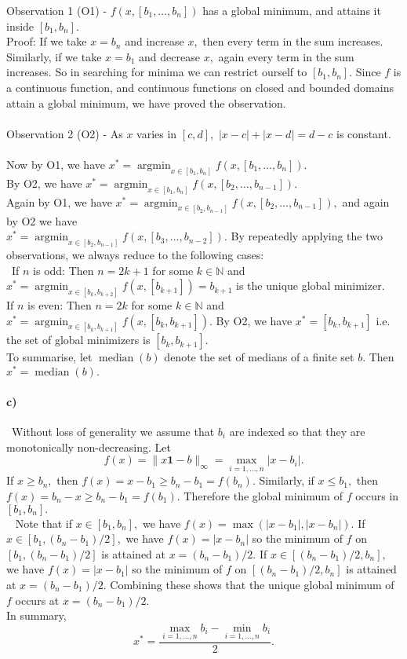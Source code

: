\documentclass[a4paper,12pt]{article}
\begin{document}
Observation 1 (O1) - $f(x, [b_1, \ldots, b_n])$ has a global minimum, and attains it inside $[b_1, b_n].$ 
\\
Proof: If we take $x=b_n$ and increase $x,$ then every term in the sum increases. Similarly, if we take $x=b_1$ and decrease $x,$ again every term in the sum increases. So in searching for minima we can restrict ourself to $[b_1,b_n].$ Since $f$ is a continuous function, and continuous functions on closed and bounded domains attain a global minimum, we have proved the observation. \\
\\
Observation 2 (O2) - As $x$ varies in $[c, d],$ $|x-c| + |x-d| = d-c$ is constant. \\
\\
Now by O1, we have $x^* = \operatorname{argmin}_{x\in[b_1,b_n]} f(x,[b_1,\ldots, b_n]).$ \\
By O2, we have $x^* = \operatorname{argmin}_{x\in[b_1,b_n]} f(x,[b_2,\ldots, b_{n-1}]).$ \\
Again by O1, we have $x^* = \operatorname{argmin}_{x\in[b_2,b_{n-1}]} f(x,[b_2,\ldots, b_{n-1}]),$ and again by O2 we have \\
$x^* = \operatorname{argmin}_{x\in[b_2,b_{n-1}]} f(x,[b_3,\ldots, b_{n-2}]).$ By repeatedly applying the two observations, we always reduce to the following cases: \\
\
If $n$ is odd: Then $n=2k+1$ for some $k\in \mathbb{N}$ and $x^* = \operatorname{argmin}_{x\in [b_k, b_{k+2}]} f(x, [b_{k+1}]) = b_{k+1}$ is the unique global minimizer.\\
If $n$ is even: Then $n=2k$ for some $k\in \mathbb{N}$ and $x^* = \operatorname{argmin}_{x\in [b_k, b_{k+1}]} f(x, [b_k, b_{k+1}]).$ By O2, we have $x^* = [b_k, b_{k+1}]$ i.e. the set of global minimizers is $[b_k, b_{k+1}].$ 
\\ To summarise, let $\operatorname{median}(b)$ denote the set of medians of a finite set $b.$ Then $x^* =  \operatorname{median}(b).$

\paragraph{c)}
\
Without loss of generality we assume that $b_i$ are indexed so that they are monotonically non-decreasing. Let $$f(x) = \| x \mathbf{1} - b \|_{\infty} = \max_{i=1,\ldots, n} | x- b_i|.$$ If $x\geq b_n, $ then $f(x) = x - b_1 \geq b_n-b_1 = f(b_n).$ Similarly, if $x\leq b_1,$ then $f(x) = b_n - x \geq b_n - b_1 = f(b_1). $ Therefore the global minimum of $f$ occurs in $[b_1, b_n]. $\\
\
\newline
Note that if $x\in [b_1, b_n],$ we have $f(x) = \max( |x-b_1|, |x-b_n|).$ If $x\in [b_1, (b_n-b_1)/2],$ we have $f(x) = |x-b_n|$ so the minimum of $f$ on $[b_1, (b_n-b_1)/2]$ is attained at $x = (b_n-b_1)/2.$ If $x\in [(b_n-b_1)/2, b_n],$ we have $f(x) = |x-b_1|$ so the minimum of $f$ on $[(b_n-b_1)/2, b_n]$ is attained at $x = (b_n-b_1)/2.$ Combining these shows that the unique global minimum of $f$ occurs at $x= (b_n-b_1)/2.$ \\
In summary, $$ x^* = \frac{ \max_{i=1,\ldots, n} b_i - \min_{i=1,\ldots, n} b_i}{2}.$$
\end{document}
